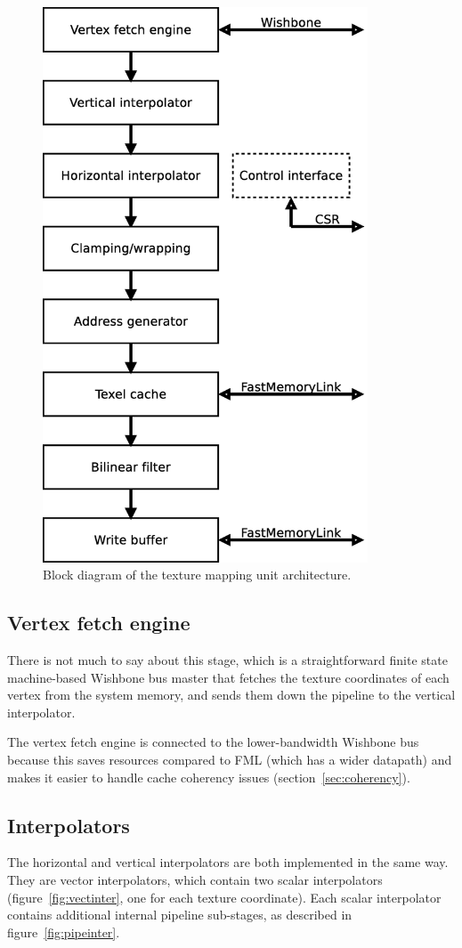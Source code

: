 \documentclass[a4paper,11pt]{kthesis}
\begin{document}
\begin{figure}[htp]
\centering
\includegraphics[height=165mm]{tmublock.eps}
\caption{Block diagram of the texture mapping unit architecture.}
\label{fig:tmublock}
\end{figure}

\subsection{Vertex fetch engine}
There is not much to say about this stage, which is a straightforward finite state machine-based Wishbone bus master that fetches the texture coordinates of each vertex from the system memory, and sends them down the pipeline to the vertical interpolator.

The vertex fetch engine is connected to the lower-bandwidth Wishbone bus because this saves resources compared to FML (which has a wider datapath) and makes it easier to handle cache coherency issues (section~\ref{sec:coherency}).

\subsection{Interpolators}
The horizontal and vertical interpolators are both implemented in the same way. They are vector interpolators, which contain two scalar interpolators (figure~\ref{fig:vectinter}, one for each texture coordinate). Each scalar interpolator contains additional internal pipeline sub-stages, as described in figure~\ref{fig:pipeinter}.
\end{document}
